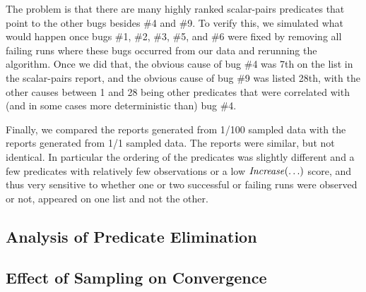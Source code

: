 The problem is that there are many highly ranked scalar-pairs
predicates that point to the other bugs besides
\#4 and \#9.  To verify this, we simulated what would happen once bugs
\#1, \#2, \#3, \#5, and \#6 were fixed by removing all failing runs where
these bugs occurred from our data and rerunning the algorithm.  Once
we did that, the obvious cause of bug \#4 was 7th on the list in the
scalar-pairs report, and the obvious cause of bug \#9 was listed 28th,
with the other causes between 1 and 28 being other predicates that
were correlated with (and in some cases more deterministic than) bug
\#4.

Finally, we compared the reports generated from 1/100 sampled data
with the reports generated from 1/1 sampled data.  The reports were
similar, but not identical.  In particular the ordering of the
predicates was slightly different and a few predicates with relatively
few observations or a low $\mbox{\textit{Increase}}(\ldots)$ score, and thus very
sensitive to whether one or two successful or failing runs were
observed or not, appeared on one list and not the other.


\subsection{Analysis of Predicate Elimination}

\subsection{Effect of Sampling on Convergence}





